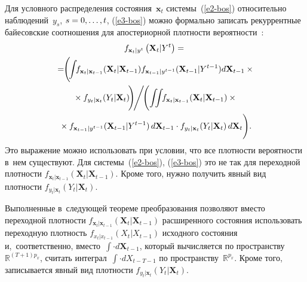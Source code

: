 \begin{multicols}{2}
     Для условного распределения со\-сто\-яния~$\mathbf{x}_t$ 
сис\-те\-мы~(\ref{e2-bos}) относительно наблюдений~$y_s$, $s\hm= 0,\ldots , t$, 
(\ref{e3-bos}) мож\-но формально записать рекуррентные байесовские 
соотношения для апостериорной плот\-ности ве\-ро\-ят\-ности~\cite{21-bos}:
     \begin{multline*}
     f_{\mathbf{x}_t\vert y^t} \left( \mathbf{X}_t\vert Y^t\right) = {}\\
    \! {}=\!\!
     \Bigg(\!\!\int \!\! f_{\mathbf{x}_t\vert \mathbf{x}_{t-1}} (\mathbf{X}_t\vert 
\mathbf{X}_{t-1}) f_{\mathbf{x}_{t-1}\vert y^{t-1}} (\mathbf{X}_{t-1}\vert 
Y^{t-1}) d\mathbf{X}_{t-1} \times{}\hspace*{-1.10406pt}\\
{}\times  f_{y_t\vert \mathbf{x}_t} (Y_t\vert 
\mathbf{X}_t)\!\Bigg) \!\Bigg/\!  \Bigg (\! \iint\!\! f_{\mathbf{x}_t\vert \mathbf{x}_{t-1}} (\mathbf{X}_t\vert 
\mathbf{X}_{t-1})\times{}\\
{}\times f_{\mathbf{x}_{t-1}\vert y^{t-1}} (\mathbf{X}_{t-1}\vert 
Y^{t-1})\,d\mathbf{X}_{t-1}\cdot f_{y_t\vert \mathbf{x}_t} (Y_t\vert 
\mathbf{X}_t)\,d\mathbf{X}_t \Bigg).
     \end{multline*}
Это выражение мож\-но использовать при условии, что все плотности 
ве\-ро\-ят\-ности в~нем существуют. Для сис\-те\-мы~(\ref{e2-bos}), (\ref{e3-bos}) это 
не так для переходной плот\-ности $f_{\mathbf{x}_t\vert \mathbf{x}_{t-1}} 
\left( \mathbf{X}_t\vert \mathbf{X}_{t-1}\right)$. Кроме того, нуж\-но получить 
явный вид плот\-ности $f_{y_t\vert\mathbf{x}_t}\left( Y_t\vert \mathbf{X}_t\right)$.
        
     Выполненные в~следующей тео\-ре\-ме преобразования поз\-во\-ля\-ют 
вмес\-то переходной плот\-ности $f_{\mathbf{x}_t\vert\mathbf{x}_{t-1}}\left( 
\mathbf{X}_t\vert\mathbf{X}_{t-1}\right)$ расширенного со\-сто\-яния 
использовать переходную плот\-ность $f_{x_t\vert x_{t-1}}\left( X_t\vert X_{t-1}\right)$ 
исходного со\-сто\-яния и,~соответственно, вмес\-то~$\int\cdot d\mathbf{X}_{t-1}$, 
который вы\-чис\-ля\-ет\-ся по пространству~$\mathbb{R}^{(T+1)p_x}$, считать интеграл~$\int\cdot dX_{t-T-1}$ по 
пространству~$\mathbb{R}^{p_x}$. Кроме того, записывается явный вид 
плот\-ности $f_{y_t\vert \mathbf{x}_t} \left( Y_t\vert \mathbf{X}_t\right)$.
     
     \smallskip
     

\end{multicols}
